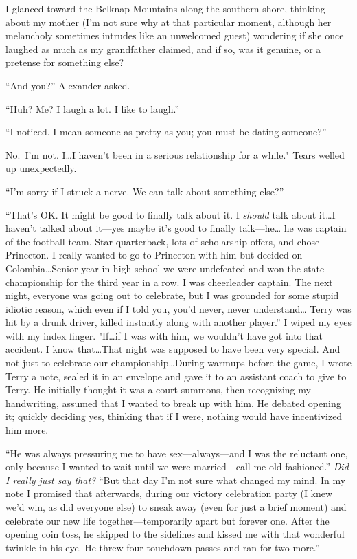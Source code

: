 I glanced toward the Belknap Mountains along the southern shore,
thinking about my mother (I'm not sure why at that particular moment,
although her melancholy sometimes intrudes like an unwelcomed guest)
wondering if she once laughed as much as my grandfather claimed, and if
so, was it genuine, or a pretense for something else?

``And you?'' Alexander asked.

``Huh? Me? I laugh a lot. I like to laugh.''

``I noticed. I mean someone as pretty as you; you must be dating
someone?''

No.~I'm not. I\ldots I haven't been in a serious relationship for a
while." Tears welled up unexpectedly.

``I'm sorry if I struck a nerve. We can talk about something else?''

``That's OK. It might be good to finally talk about it. I \emph{should}
talk about it\ldots I haven't talked about it---yes maybe it's good to
finally talk---he\ldots{} he was captain of the football team. Star
quarterback, lots of scholarship offers, and chose Princeton. I really
wanted to go to Princeton with him but decided on Colombia\ldots Senior
year in high school we were undefeated and won the state championship
for the third year in a row. I was cheerleader captain. The next night,
everyone was going out to celebrate, but I was grounded for some stupid
idiotic reason, which even if I told you, you'd never, never
understand\ldots{} Terry was hit by a drunk driver, killed instantly
along with another player.'' I wiped my eyes with my index finger.
"If\ldots if I was with him, we wouldn't have got into that accident. I
know that\ldots That night was supposed to have been very special. And
not just to celebrate our championship\ldots During warmups before the
game, I wrote Terry a note, sealed it in an envelope and gave it to an
assistant coach to give to Terry. He initially thought it was a court
summons, then recognizing my handwriting, assumed that I wanted to break
up with him. He debated opening it; quickly deciding yes, thinking that
if I were, nothing would have incentivized him more.

``He was always pressuring me to have sex---always---and I was the
reluctant one, only because I wanted to wait until we were
married---call me old-fashioned.'' \emph{Did I really just say that?}
``But that day I'm not sure what changed my mind. In my note I promised
that afterwards, during our victory celebration party (I knew we'd win,
as did everyone else) to sneak away (even for just a brief moment) and
celebrate our new life together---temporarily apart but forever one.
After the opening coin toss, he skipped to the sidelines and kissed me
with that wonderful twinkle in his eye. He threw four touchdown passes
and ran for two more.''


